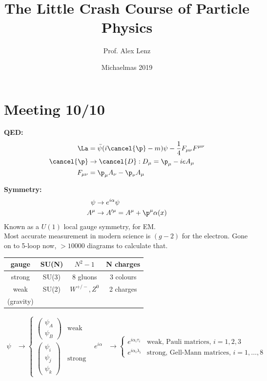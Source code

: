 \documentclass[a4paper, 11pt, normalem]{article}
\title{The Little Crash Course of Particle Physics \vspace{-20pt}}
\author{Prof. Alex Lenz}
\date{\vspace{-15pt}Michaelmas 2019}
\begin{document}
\maketitle

\section*{Meeting 10/10}
\textbf{\large QED:}
\begin{align}
    \La &= \bar{\psi}(i\cancel{\p}-m)\psi - \frac14F_{\mu\nu}F^{\mu\nu} \\
    \cancel{\p} &\to \cancel{D}: D_\mu = \p_\mu - ieA_\mu \\
    F_{\mu\nu} &= \p_\mu A_\nu - \p_\nu A_\mu
\end{align}

\textbf{\large Symmetry:}
\begin{align}
    \psi &\to e^{i\alpha}\psi \\
    A^\mu &\to A'^\mu = A^\mu + \p^\mu\alpha(x)
\end{align}
Known as a $U(1)$ local gauge symmetry, for EM. \\
Most accurate measurement in modern science is $(g-2)$ for the electron. 
Gone on to 5-loop now, $>10000$ diagrams to calculate that. 
\begin{table}[H]
    \centering
    \begin{tabular}{c|c|c|c}
        gauge & SU(N) & $N^2-1$ & N charges \\
        \hline
        strong & SU(3) & 8 gluons & 3 colours \\
        weak & SU(2) & $W^{+/-},Z^0$ & 2 charges \\
        (gravity) & & &
    \end{tabular}
\end{table}
\begin{align}
    \psi &\to \begin{cases} \begin{pmatrix} \psi_A \\ \psi_B \end{pmatrix} & \text{weak} \\ \begin{pmatrix} \psi_i \\ \psi_j \\ \psi_k \end{pmatrix} & \text{strong} \end{cases} & e^{i\alpha} &\to \begin{cases} e^{i\alpha_i\tau_i} & \text{weak, Pauli matrices, }i=1,2,3 \\ e^{i\alpha_i\lambda_i} & \text{strong, Gell-Mann matrices, }i=1,\dots,8 \end{cases}
\end{align}
\end{document}
